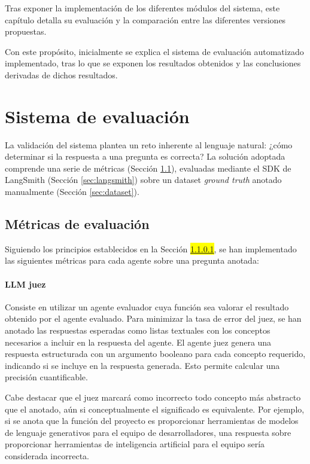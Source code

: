 Tras exponer la implementación de los diferentes módulos del sistema, este capítulo detalla su evaluación y la comparación entre las diferentes versiones propuestas.

Con este propósito, inicialmente se explica el sistema de evaluación automatizado implementado, tras lo que se exponen los resultados obtenidos y las conclusiones derivadas de dichos resultados. 

\section{Sistema de evaluación}
La validación del sistema plantea un reto inherente al lenguaje natural: ¿cómo determinar si la respuesta a una pregunta es correcta? La solución adoptada comprende una serie de métricas (Sección \ref{sec:metricas}), evaluadas mediante el SDK de LangSmith (Sección \ref{sec:langsmith}) sobre un dataset \textit{ground truth} anotado manualmente (Sección \ref{sec:dataset}).

\subsection{Métricas de evaluación}

\label{sec:metricas}
Siguiendo los principios establecidos en la Sección \colorbox{yellow}{\ref{}}, se han implementado las siguientes métricas para cada agente sobre una pregunta anotada: 
\paragraph{LLM juez} Consiste en utilizar un agente evaluador cuya función sea valorar el resultado obtenido por el agente evaluado. Para minimizar la tasa de error del juez, se han anotado las respuestas esperadas como listas textuales con los conceptos necesarios a incluir en la respuesta del agente. El agente juez genera una respuesta estructurada con un argumento booleano para cada concepto requerido, indicando si se incluye en la respuesta generada. Esto permite calcular una precisión cuantificable.

Cabe destacar que el juez marcará como incorrecto todo concepto más abstracto que el anotado, aún si conceptualmente el significado es equivalente. Por ejemplo, si se anota que la función del proyecto es proporcionar herramientas de modelos de lenguaje generativos para el equipo de desarrolladores, una respuesta sobre proporcionar herramientas de inteligencia artificial para el equipo sería considerada incorrecta.

